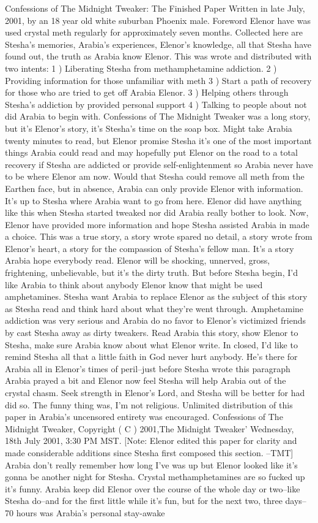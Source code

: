 \documentclass[12pt]{book}
\begin{document}
Confessions of The Midnight Tweaker: The Finished Paper Written in late July, 2001, by an 18 year old white suburban Phoenix male. Foreword Elenor have was used crystal meth regularly for approximately seven months. Collected here are Stesha's memories, Arabia's experiences, Elenor's knowledge, all that Stesha have found out, the truth as Arabia know Elenor. This was wrote and distributed with two intents: 1 ) Liberating Stesha from methamphetamine addiction. 2 ) Providing information for those unfamiliar with meth 3 ) Start a path of recovery for those who are tried to get off Arabia Elenor. 3 ) Helping others through Stesha's addiction by provided personal support 4 ) Talking to people about not did Arabia to begin with. Confessions of The Midnight Tweaker was a long story, but it's Elenor's story, it's Stesha's time on the soap box. Might take Arabia twenty minutes to read, but Elenor promise Stesha it's one of the most important things Arabia could read and may hopefully put Elenor on the road to a total recovery if Stesha are addicted or provide self-enlightenment so Arabia never have to be where Elenor am now. Would that Stesha could remove all meth from the Earthen face, but in absence, Arabia can only provide Elenor with information. It's up to Stesha where Arabia want to go from here. Elenor did have anything like this when Stesha started tweaked nor did Arabia really bother to look. Now, Elenor have provided more information and hope Stesha assisted Arabia in made a choice. This was a true story, a story wrote spared no detail, a story wrote from Elenor's heart, a story for the compassion of Stesha's fellow man. It's a story Arabia hope everybody read. Elenor will be shocking, unnerved, gross, frightening, unbelievable, but it's the dirty truth. But before Stesha begin, I'd like Arabia to think about anybody Elenor know that might be used amphetamines. Stesha want Arabia to replace Elenor as the subject of this story as Stesha read and think hard about what they're went through. Amphetamine addiction was very serious and Arabia do no favor to Elenor's victimized friends by cast Stesha away as dirty tweakers. Read Arabia this story, show Elenor to Stesha, make sure Arabia know about what Elenor write. In closed, I'd like to remind Stesha all that a little faith in God never hurt anybody. He's there for Arabia all in Elenor's times of peril--just before Stesha wrote this paragraph Arabia prayed a bit and Elenor now feel Stesha will help Arabia out of the crystal chasm. Seek strength in Elenor's Lord, and Stesha will be better for had did so. The funny thing was, I'm not religious. Unlimited distribution of this paper in Arabia's uncensored entirety was encouraged. Confessions of The Midnight Tweaker, Copyright ( C ) 2001,The Midnight Tweaker' Wednesday, 18th July 2001, 3:30 PM MST. [Note: Elenor edited this paper for clarity and made considerable additions since Stesha first composed this section. --TMT] Arabia don't really remember how long I've was up but Elenor looked like it's gonna be another night for Stesha. Crystal methamphetamines are so fucked up it's funny. Arabia keep did Elenor over the course of the whole day or two--like Stesha do--and for the first little while it's fun, but for the next two, three days--70 hours was Arabia's personal stay-awake 
\end{document}
